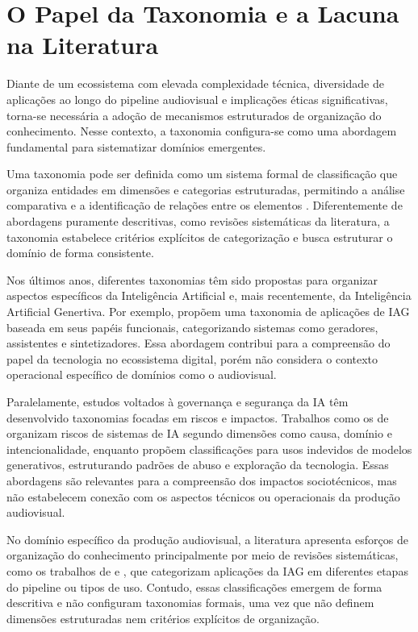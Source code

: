\section{O Papel da Taxonomia e a Lacuna na Literatura}

Diante de um ecossistema com elevada complexidade técnica, diversidade de aplicações ao longo do pipeline audiovisual e implicações éticas significativas, torna-se necessária a adoção de mecanismos estruturados de organização do conhecimento. Nesse contexto, a taxonomia configura-se como uma abordagem fundamental para sistematizar domínios emergentes.

Uma taxonomia pode ser definida como um sistema formal de classificação que organiza entidades em dimensões e categorias estruturadas, permitindo a análise comparativa e a identificação de relações entre os elementos \citep{Wieringa2006}. Diferentemente de abordagens puramente descritivas, como revisões sistemáticas da literatura, a taxonomia estabelece critérios explícitos de categorização e busca estruturar o domínio de forma consistente.

Nos últimos anos, diferentes taxonomias têm sido propostas para organizar aspectos específicos da Inteligência Artificial e, mais recentemente, da Inteligência Artificial Genertiva. Por exemplo, \citet{strobel2024} propõem uma taxonomia de aplicações de IAG baseada em seus papéis funcionais, categorizando sistemas como geradores, assistentes e sintetizadores. Essa abordagem contribui para a compreensão do papel da tecnologia no ecossistema digital, porém não considera o contexto operacional específico de domínios como o audiovisual.

Paralelamente, estudos voltados à governança e segurança da IA têm desenvolvido taxonomias focadas em riscos e impactos. Trabalhos como os de \citet{slattery2024} organizam riscos de sistemas de IA segundo dimensões como causa, domínio e intencionalidade, enquanto \citet{marchal2024} propõem classificações para usos indevidos de modelos generativos, estruturando padrões de abuso e exploração da tecnologia. Essas abordagens são relevantes para a compreensão dos impactos sociotécnicos, mas não estabelecem conexão com os aspectos técnicos ou operacionais da produção audiovisual.

No domínio específico da produção audiovisual, a literatura apresenta esforços de organização do conhecimento principalmente por meio de revisões sistemáticas, como os trabalhos de \citet{lazarte2025} e \citet{orak2024}, que categorizam aplicações da IAG em diferentes etapas do pipeline ou tipos de uso. Contudo, essas classificações emergem de forma descritiva e não configuram taxonomias formais, uma vez que não definem dimensões estruturadas nem critérios explícitos de organização.

